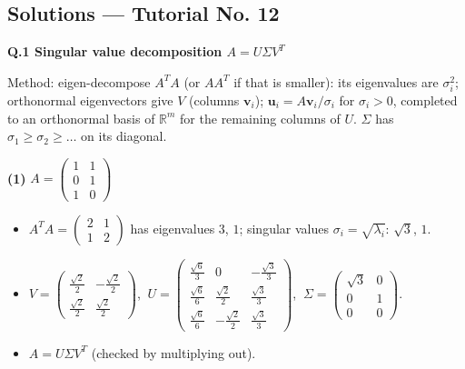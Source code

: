 \subsection*{Solutions --- Tutorial No. 12}
\medskip\noindent\textbf{Q.1  Singular value decomposition $A=U\Sigma V^T$}\par\smallskip
Method: eigen-decompose $A^TA$ (or $AA^T$ if that is smaller): its eigenvalues are $\sigma_i^2$; orthonormal eigenvectors give $V$ (columns $\mathbf v_i$); $\mathbf u_i=A\mathbf v_i/\sigma_i$ for $\sigma_i>0$, completed to an orthonormal basis of $\mathbb{R}^m$ for the remaining columns of $U$. $\Sigma$ has $\sigma_1\ge\sigma_2\ge\dots$ on its diagonal.

\noindent\textbf{(1)} $A=\begin{pmatrix}1 & 1 \\ 0 & 1 \\ 1 & 0\end{pmatrix}$
\begin{itemize}\item $A^TA=\begin{pmatrix}2 & 1 \\ 1 & 2\end{pmatrix}$ has eigenvalues $3$, $1$; singular values $\sigma_i=\sqrt{\lambda_i}$: $\sqrt{3}$, $1$.
\item $V=\begin{pmatrix}\frac{\sqrt{2}}{2} & - \frac{\sqrt{2}}{2} \\ \frac{\sqrt{2}}{2} & \frac{\sqrt{2}}{2}\end{pmatrix}$, $\ U=\begin{pmatrix}\frac{\sqrt{6}}{3} & 0 & - \frac{\sqrt{3}}{3} \\ \frac{\sqrt{6}}{6} & \frac{\sqrt{2}}{2} & \frac{\sqrt{3}}{3} \\ \frac{\sqrt{6}}{6} & - \frac{\sqrt{2}}{2} & \frac{\sqrt{3}}{3}\end{pmatrix}$, $\ \Sigma=\begin{pmatrix}\sqrt{3} & 0 \\ 0 & 1 \\ 0 & 0\end{pmatrix}$.
\item $A=U\Sigma V^T$ (checked by multiplying out).\end{itemize}

